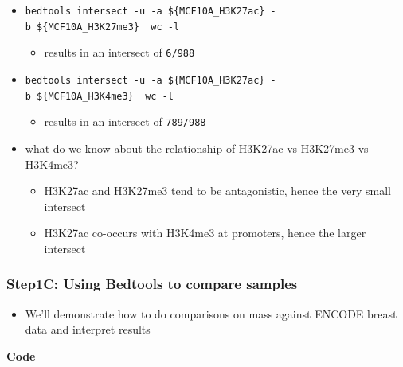 \documentclass[
]{book}
\providecommand{\tightlist}{%
  \setlength{\itemsep}{0pt}\setlength{\parskip}{0pt}}
\begin{document}
\begin{itemize}
\tightlist
\item
  \texttt{bedtools\ intersect\ -u\ -a\ \$\{MCF10A\_H3K27ac\}\ -b\ \$\{MCF10A\_H3K27me3\}\ \textbar{}\ wc\ -l}

  \begin{itemize}
  \tightlist
  \item
    results in an intersect of \texttt{6/988}
  \end{itemize}
\item
  \texttt{bedtools\ intersect\ -u\ -a\ \$\{MCF10A\_H3K27ac\}\ -b\ \$\{MCF10A\_H3K4me3\}\ \textbar{}\ wc\ -l}

  \begin{itemize}
  \tightlist
  \item
    results in an intersect of \texttt{789/988}
  \end{itemize}
\item
  what do we know about the relationship of H3K27ac vs H3K27me3 vs H3K4me3?

  \begin{itemize}
  \tightlist
  \item
    H3K27ac and H3K27me3 tend to be antagonistic, hence the very small intersect
  \item
    H3K27ac co-occurs with H3K4me3 at promoters, hence the larger intersect
  \end{itemize}
\end{itemize}

\subsubsection{Step1C: Using Bedtools to compare samples}\label{step1c-using-bedtools-to-compare-samples}

\begin{itemize}
\tightlist
\item
  We'll demonstrate how to do comparisons on mass against ENCODE breast data and interpret results
\end{itemize}

\textbf{Code}
\end{document}
